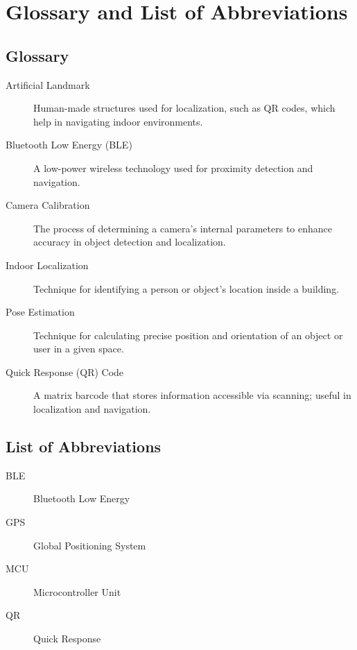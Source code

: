

\chapter*{Glossary and List of Abbreviations}

\section*{Glossary}
\begin{description}
	\item[Artificial Landmark] Human-made structures used for localization, such as QR codes, which help in navigating indoor environments.
	\item[Bluetooth Low Energy (BLE)] A low-power wireless technology used for proximity detection and navigation.
	\item[Camera Calibration] The process of determining a camera's internal parameters to enhance accuracy in object detection and localization.
	\item[Indoor Localization] Technique for identifying a person or object’s location inside a building.
	\item[Pose Estimation] Technique for calculating precise position and orientation of an object or user in a given space.
	\item[Quick Response (QR) Code] A matrix barcode that stores information accessible via scanning; useful in localization and navigation.
\end{description}

\section*{List of Abbreviations}
\begin{description}
	\item[BLE] Bluetooth Low Energy
	\item[GPS] Global Positioning System
	\item[MCU] Microcontroller Unit
	\item[QR] Quick Response
\end{description}
